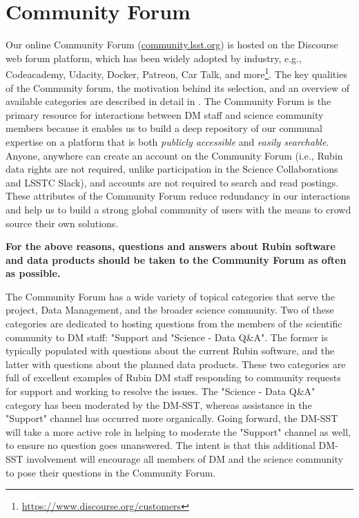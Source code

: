 \documentclass[DM,lsstdraft,authoryear,toc]{lsstdoc}
\begin{document}
\section{Community Forum}\label{sec:forum}

Our online Community Forum (\url{community.lsst.org}) is hosted on the Discourse web forum platform, which has been widely adopted by industry, e.g., Codeacademy, Udacity, Docker, Patreon, Car Talk, and more\footnote{\url{https://www.discourse.org/customers}}.
The key qualities of the Community forum, the motivation behind its selection, and an overview of available categories are described in detail in .
The Community Forum is the primary resource for interactions between DM staff and science community members because it enables us to build a deep repository of our communal expertise on a platform that is both {\it publicly accessible} and {\it easily searchable}.
Anyone, anywhere can create an account on the Community Forum (i.e., Rubin data rights are not required, unlike participation in the Science Collaborations and LSSTC Slack), and accounts are not required to search and read postings. 
These attributes of the Community Forum reduce redundancy in our interactions and help us to build a strong global community of users with the means to crowd source their own solutions.

{\bf For the above reasons, questions and answers about Rubin software and data products should be taken to the Community Forum as often as possible.}

The Community Forum has a wide variety of topical categories that serve the project, Data Management, and the broader science community. 
Two of these categories are dedicated to hosting questions from the members of the scientific community to DM staff: "Support and "Science - Data Q\&A".
The former is typically populated with questions about the current Rubin software, and the latter with questions about the planned data products.
These two categories are full of excellent examples of Rubin DM staff responding to community requests for support and working to resolve the issues.
The "Science - Data Q\&A" category has been moderated by the DM-SST, whereas assistance in the "Support" channel has occurred more organically.
Going forward, the DM-SST will take a more active role in helping to moderate the "Support" channel as well, to ensure no question goes unanswered.
The intent is that this additional DM-SST involvement will encourage all members of DM and the science community to pose their questions in the Community Forum.
\end{document}
